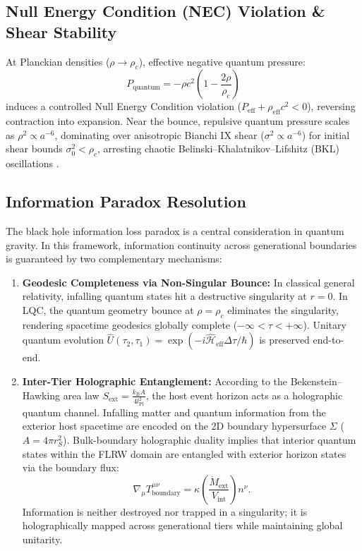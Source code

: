 \documentclass[11pt,a4paper]{article}
\begin{document}
\subsection{Null Energy Condition (NEC) Violation \& Shear Stability}\label{sec:nec_shear}
At Planckian densities ($\rho \to \rho_c$), effective negative quantum pressure:
\begin{equation}\label{eq:quantum_pressure}
    P_{\text{quantum}} = -\rho c^2 \left(1 - \frac{2\rho}{\rho_c}\right)
\end{equation}
induces a controlled Null Energy Condition violation ($P_{\text{eff}} + \rho_{\text{eff}} c^2 < 0$), reversing contraction into expansion. Near the bounce, repulsive quantum pressure scales as $\rho^2 \propto a^{-6}$, dominating over anisotropic Bianchi IX shear ($\sigma^2 \propto a^{-6}$) for initial shear bounds $\sigma_0^2 < \rho_c$, arresting chaotic Belinski--Khalatnikov--Lifshitz (BKL) oscillations \cite{corichi2012}.

\subsection{Information Paradox Resolution}\label{sec:info_paradox}
The black hole information loss paradox is a central consideration in quantum gravity. In this framework, information continuity across generational boundaries is guaranteed by two complementary mechanisms:
\begin{enumerate}
    \item \textbf{Geodesic Completeness via Non-Singular Bounce:} In classical general relativity, infalling quantum states hit a destructive singularity at $r=0$. In LQC, the quantum geometry bounce at $\rho = \rho_c$ eliminates the singularity, rendering spacetime geodesics globally complete ($-\infty < \tau < +\infty$). Unitary quantum evolution $\hat{U}(\tau_2, \tau_1) = \exp(-i \hat{\mathcal{H}}_{\text{eff}} \Delta\tau/\hbar)$ is preserved end-to-end.
    \item \textbf{Inter-Tier Holographic Entanglement:} According to the Bekenstein--Hawking area law $S_{\text{ext}} = \frac{k_{\text{B}} A}{4 l_{\text{Pl}}^2}$, the host event horizon acts as a holographic quantum channel. Infalling matter and quantum information from the exterior host spacetime are encoded on the 2D boundary hypersurface $\Sigma$ ($A = 4\pi r_S^2$). Bulk-boundary holographic duality implies that interior quantum states within the FLRW domain are entangled with exterior horizon states via the boundary flux:
    \begin{equation}\label{eq:holo_flux}
        \nabla_\mu T_{\text{boundary}}^{\mu\nu} = \kappa \left( \frac{\dot{M}_{\text{ext}}}{V_{\text{int}}} \right) n^\nu.
    \end{equation}
    Information is neither destroyed nor trapped in a singularity; it is holographically mapped across generational tiers while maintaining global unitarity.
\end{enumerate}
\end{document}

